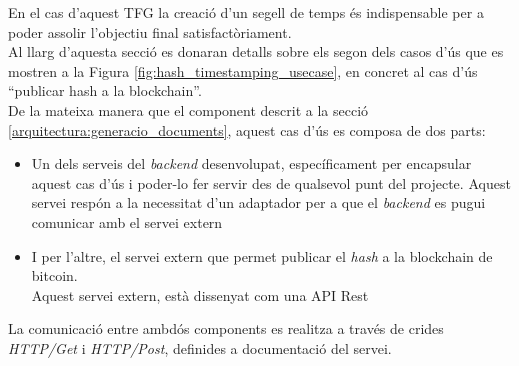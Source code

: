 \newline En el cas d'aquest TFG la creació d'un segell de temps és indispensable per a poder assolir l'objectiu final satisfactòriament.\\
\newline Al llarg d'aquesta secció es donaran detalls sobre els segon dels casos d'ús que es mostren a la Figura \ref{fig:hash_timestamping_usecase}, en concret al cas d'ús ``publicar hash a la blockchain''.\\
\newline De la mateixa manera que el component descrit a la secció \ref{arquitectura:generacio_documents}, aquest cas d'ús es composa de dos parts:
\begin{itemize}
    \item Un dels serveis del \textit{backend} desenvolupat, específicament per encapsular aquest cas d'ús i poder-lo fer servir des de qualsevol punt del projecte.
    Aquest servei respón a la necessitat d'un adaptador per a que el \textit{backend} es pugui comunicar amb el servei extern
    \item I per l'altre, el servei extern que permet publicar el \textit{hash} a la blockchain de bitcoin.\\
    Aquest servei extern, està dissenyat com una API Rest
\end{itemize}
La comunicació entre ambdós components es realitza a través de crides \textit{HTTP/Get} i \textit{HTTP/Post}, definides a documentació del servei.

